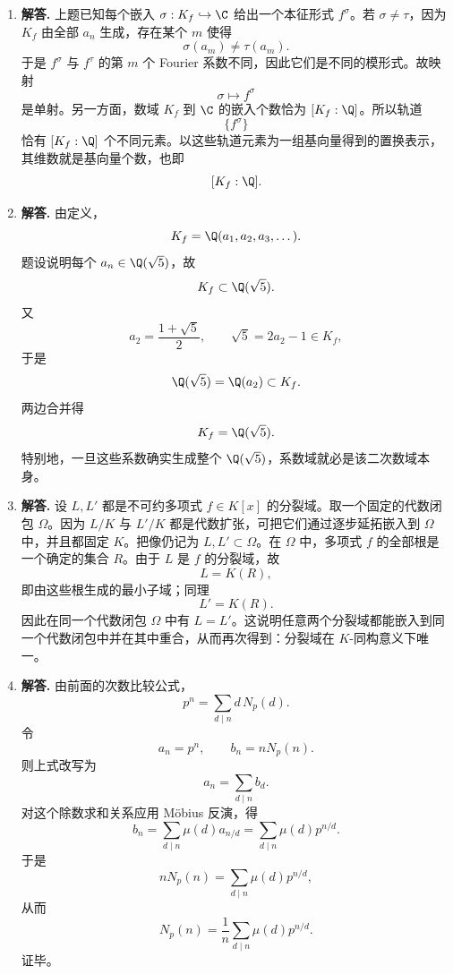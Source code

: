 \begin{enumerate}[label=\textbf{\arabic*.}, leftmargin=*, itemsep=1em]
\item \textbf{解答.} 上题已知每个嵌入 $\sigma:K_f\hookrightarrow\C$ 给出一个本征形式 $f^\sigma$。若 $\sigma\ne\tau$，因为 $K_f$ 由全部 $a_n$ 生成，存在某个 $m$ 使得
\[
\sigma(a_m)\ne\tau(a_m).
\]
于是 $f^\sigma$ 与 $f^\tau$ 的第 $m$ 个 Fourier 系数不同，因此它们是不同的模形式。故映射
\[
\sigma\longmapsto f^\sigma
\]
是单射。另一方面，数域 $K_f$ 到 $\C$ 的嵌入个数恰为 $[K_f:\Q]$。所以轨道
\[
\{f^\sigma\}
\]
恰有 $[K_f:\Q]$ 个不同元素。以这些轨道元素为一组基向量得到的置换表示，其维数就是基向量个数，也即
\[
[K_f:\Q].
\]

\item \textbf{解答.} 由定义，
\[
K_f=\Q(a_1,a_2,a_3,\dots).
\]
题设说明每个 $a_n\in\Q(\sqrt5)$，故
\[
K_f\subset \Q(\sqrt5).
\]
又
\[
a_2=\frac{1+\sqrt5}{2},
\qquad \sqrt5=2a_2-1\in K_f,
\]
于是
\[
\Q(\sqrt5)=\Q(a_2)\subset K_f.
\]
两边合并得
\[
K_f=\Q(\sqrt5).
\]
特别地，一旦这些系数确实生成整个 $\Q(\sqrt5)$，系数域就必是该二次数域本身。

\item \textbf{解答.} 设 $L,L'$ 都是不可约多项式 $f\in K[x]$ 的分裂域。取一个固定的代数闭包 $\Omega$。因为 $L/K$ 与 $L'/K$ 都是代数扩张，可把它们通过逐步延拓嵌入到 $\Omega$ 中，并且都固定 $K$。把像仍记为 $L,L'\subset\Omega$。在 $\Omega$ 中，多项式 $f$ 的全部根是一个确定的集合 $R$。由于 $L$ 是 $f$ 的分裂域，故
\[
L=K(R),
\]
即由这些根生成的最小子域；同理
\[
L'=K(R).
\]
因此在同一个代数闭包 $\Omega$ 中有 $L=L'$。这说明任意两个分裂域都能嵌入到同一个代数闭包中并在其中重合，从而再次得到：分裂域在 $K$-同构意义下唯一。

\item \textbf{解答.} 由前面的次数比较公式，
\[
p^n=\sum_{d\mid n} d\,N_p(d).
\]
令
\[
a_n=p^n,
\qquad b_n=nN_p(n).
\]
则上式改写为
\[
a_n=\sum_{d\mid n} b_d.
\]
对这个除数求和关系应用 Möbius 反演，得
\[
b_n=\sum_{d\mid n}\mu(d)a_{n/d}=
\sum_{d\mid n}\mu(d)p^{n/d}.
\]
于是
\[
nN_p(n)=\sum_{d\mid n}\mu(d)p^{n/d},
\]
从而
\[
N_p(n)=\frac1n\sum_{d\mid n}\mu(d)p^{n/d}.
\]
证毕。
\end{enumerate}

